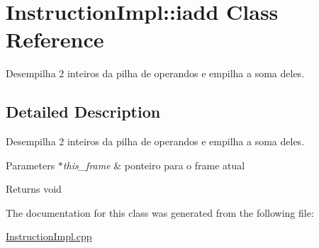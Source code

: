 \hypertarget{class_instruction_impl_1_1iadd}{}\section{Instruction\+Impl\+:\+:iadd Class Reference}
\label{class_instruction_impl_1_1iadd}


Desempilha 2 inteiros da pilha de operandos e empilha a soma deles.  




\subsection{Detailed Description}
Desempilha 2 inteiros da pilha de operandos e empilha a soma deles. 


\begin{DoxyParams}{Parameters}
{\em $\ast$this\+\_\+frame} & ponteiro para o frame atual \\
\hline
\end{DoxyParams}
\begin{DoxyReturn}{Returns}
void 
\end{DoxyReturn}


The documentation for this class was generated from the following file\+:\begin{DoxyCompactItemize}
\item 
\hyperlink{_instruction_impl_8cpp}{Instruction\+Impl.\+cpp}\end{DoxyCompactItemize}
